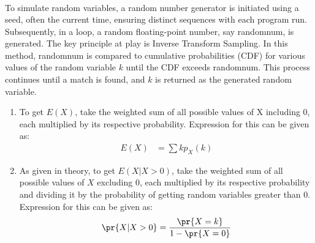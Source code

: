 \documentclass[journal,12pt,onecolumn]{IEEEtran}
\theoremstyle{remark}
\begin{document}
\begin{enumerate}
\begin{align}
\end{align}
To simulate random variables, a random number generator is initiated using a seed, often the current time, ensuring distinct sequences with each program run. Subsequently, in a loop, a random floating-point number, say randomnum, is generated. The key principle at play is Inverse Transform Sampling. In this method, randomnum is compared to cumulative probabilities (CDF) for various values of the random variable $k$ until the CDF exceeds randomnum. This process continues until a match is found, and $k$ is returned as the generated random variable.
\begin{enumerate}
\item To get $E(X)$, take the weighted sum of all possible values of X including $0$, each multiplied by its respective probability. Expression for this can be given as:
\begin{align}
	E(X)&=\sum k p_X(k)
\end{align}
\item As given in theory, to get $E(X|X>0)$, take the weighted sum of all possible values of $X$ excluding $0$, each multiplied by its respective probability and dividing it by the probability of getting random variables greater than $0$. Expression for this can be given as:
\begin{align}
	\pr{X|X>0}&=\frac{\pr{X=k}}{1-\pr{X=0}}\\
\end{align}
\end{enumerate}

\end{enumerate}
\end{document}
